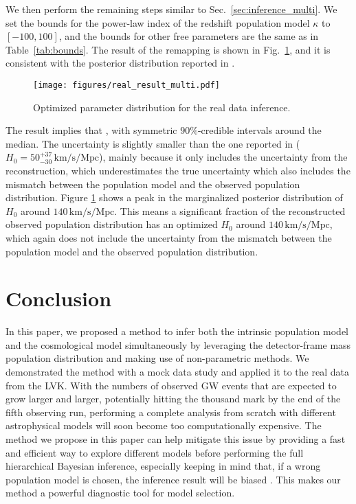 \documentclass[sn-aps, pdflatex, iicol]{sn-jnl}
\begin{document}
We then perform the remaining steps similar to Sec.~\ref{sec:inference_multi}.
We set the bounds for the power-law index of the redshift population model $\kappa$ to $[-100, 100]$, and the bounds for other free parameters are the same as in Table~\ref{tab:bounds}.
The result of the remapping is shown in Fig.~\ref{fig:real_result_multi}, and it is consistent with the posterior distribution reported in \cite{LIGOScientific:2021aug}.
\begin{figure}
    \texttt{[image: figures/real\_result\_multi.pdf]}
    \caption{
        Optimized parameter distribution for the real data inference.
    }
    \label{fig:real_result_multi}
\end{figure}
The result implies that , with symmetric $90\%$-credible intervals around the median.
The uncertainty is slightly smaller than the one reported in \cite{LIGOScientific:2021aug} ($H_0 = 50^{+37}_{-30} \, \mathrm{km/s/Mpc}$), mainly because it only includes the uncertainty from the reconstruction, which underestimates the true uncertainty which also includes the mismatch between the population model and the observed population distribution.
Figure \ref{fig:real_result_multi} shows a peak in the marginalized posterior distribution of $H_0$ around $140\, \mathrm{km/s/Mpc}$.
This means a significant fraction of the reconstructed observed population distribution has an optimized $H_0$ around $140\, \mathrm{km/s/Mpc}$, which again does not include the uncertainty from the mismatch between the population model and the observed population distribution.

\section{Conclusion}
\label{sec:conclusion}

In this paper, we proposed a method to infer both the intrinsic population model and the cosmological model simultaneously by leveraging the detector-frame mass population distribution and making use of non-parametric methods.
We demonstrated the method with a mock data study and applied it to the real data from the \ac{LVK}.
With the numbers of observed \ac{GW} events that are expected to grow larger and larger, potentially hitting the thousand mark by the end of the fifth observing run, performing a complete analysis from scratch with different astrophysical models will soon become too computationally expensive.
The method we propose in this paper can help mitigate this issue by providing a fast and efficient way to explore different models before performing the full hierarchical Bayesian inference, especially keeping in mind that, if a wrong population model is chosen, the inference result will be biased \citep{Mukherjee:2021rtw, Mastrogiovanni:2021wsd, Pierra:2023deu, LIGOScientific:2020kqk, KAGRA:2021duu, LIGOScientific:2021aug}.
This makes our method a powerful diagnostic tool for model selection.
\end{document}

